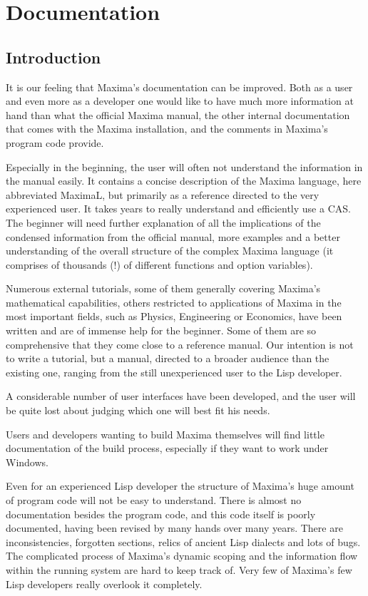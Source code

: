 \documentclass[../Maxima_Workbook.tex]{subfiles}
\begin{document}
\chapter{Documentation}

\section{Introduction}

It is our feeling that Maxima's documentation can be improved. Both as a user and even more as a developer one would like to have much more information at hand than what the official Maxima manual, the other internal documentation that comes with the Maxima installation, and the comments in Maxima's program code provide. 

\lz Especially in the beginning, the user will often not understand the information in the manual easily. It contains a concise description of the Maxima language, here abbreviated MaximaL, but primarily as a reference directed to the very experienced user. It takes years to really understand and efficiently use a CAS. The beginner will need further explanation of all the implications of the condensed information from the official manual, more examples and a better understanding of the overall structure of the complex Maxima language (it comprises of thousands (!) of different functions and option variables).

\lz Numerous external tutorials, some of them generally covering Maxima's mathematical capabilities, others restricted to applications of Maxima in the most important fields, such as Physics, Engineering or Economics, have been written and are of immense help for the beginner. Some of them are so comprehensive that they come close to a reference manual. Our intention is not to write a tutorial, but a manual, directed to a broader audience than the existing one, ranging from the still unexperienced user to the Lisp developer.

\lz A considerable number of user interfaces have been developed, and the user will be quite lost about judging which one will best fit his needs.

\lz Users and developers wanting to build Maxima themselves will find little documentation of the build process, especially if they want to work under Windows.

\lz Even for an experienced Lisp developer the structure of Maxima's huge amount of program code will not be easy to understand. There is almost no documentation besides the program code, and this code itself is poorly documented, having been revised by many hands over many years. There are inconsistencies, forgotten sections, relics of ancient Lisp dialects and lots of bugs. The complicated process of Maxima's dynamic scoping and the information flow within the running system are hard to keep track of. Very few of Maxima's few Lisp developers really overlook it completely.
\end{document}
